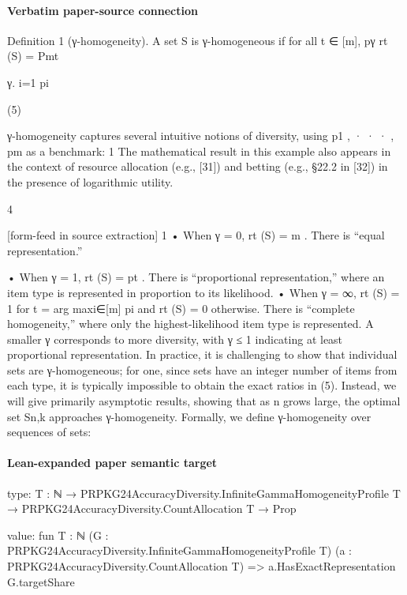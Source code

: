 \documentclass[10pt]{article}
\begin{document}
\paragraph{Verbatim paper-source connection}
\begin{ReviewVerbatim}
Definition 1 (γ-homogeneity). A set S is γ-homogeneous if for all t ∈ [m],
pγ
rt (S) = Pmt

γ.
i=1 pi

(5)

γ-homogeneity captures several intuitive notions of diversity, using p1 , · · · , pm as a benchmark:
1 The mathematical result in this example also appears in the context of resource allocation (e.g., [31]) and betting (e.g.,
§22.2 in [32]) in the presence of logarithmic utility.

4


[form-feed in source extraction]
1
• When γ = 0, rt (S) = m
. There is “equal representation.”

• When γ = 1, rt (S) = pt . There is “proportional representation,” where an item type is represented in
proportion to its likelihood.
• When γ = ∞, rt (S) = 1 for t = arg maxi∈[m] pi and rt (S) = 0 otherwise. There is “complete homogeneity,”
where only the highest-likelihood item type is represented.
A smaller γ corresponds to more diversity, with γ ≤ 1 indicating at least proportional representation. In
practice, it is challenging to show that individual sets are γ-homogeneous; for one, since sets have an integer
number of items from each type, it is typically impossible to obtain the exact ratios in (5). Instead, we will give
primarily asymptotic results, showing that as n grows large, the optimal set Sn,k approaches γ-homogeneity.
Formally, we define γ-homogeneity over sequences of sets:
\end{ReviewVerbatim}



\paragraph{Lean-expanded paper semantic target}
\begin{ReviewVerbatim}
type:
{T : ℕ} → PRPKG24AccuracyDiversity.InfiniteGammaHomogeneityProfile T → PRPKG24AccuracyDiversity.CountAllocation T → Prop

value:
fun {T : ℕ} (G : PRPKG24AccuracyDiversity.InfiniteGammaHomogeneityProfile T)
    (a : PRPKG24AccuracyDiversity.CountAllocation T) =>
  a.HasExactRepresentation G.targetShare
\end{ReviewVerbatim}
\end{document}

